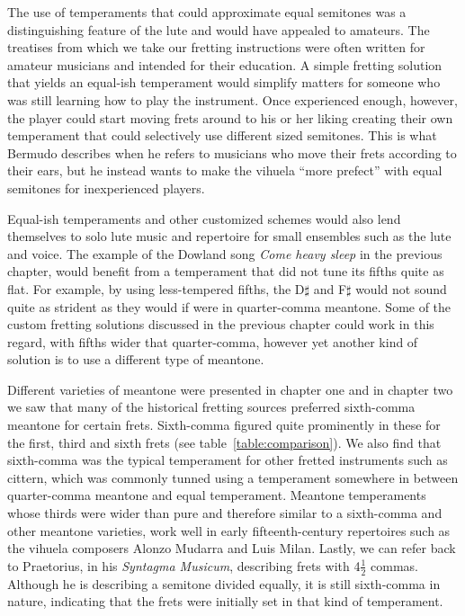 The use of temperaments that could approximate equal semitones was a distinguishing
feature of the lute and would have appealed to amateurs. The treatises from which we
take our fretting instructions were often written for amateur musicians and intended
for their education. A simple fretting solution that yields an equal-ish temperament
would simplify matters for someone who was still learning how to play the instrument.
Once experienced enough, however, the player could start moving frets around to his or
her liking creating their own temperament that could selectively use different sized
semitones. This is what Bermudo describes when he refers to musicians who move their
frets according to their ears, but he instead wants to make the vihuela ``more
prefect'' with equal semitones for inexperienced players.\autocite[78]{DE:1}

Equal-ish temperaments and other customized schemes would also lend themselves to solo
lute music and repertoire for small ensembles such as the lute and voice. The example
of the Dowland song \textit{Come heavy sleep} in the previous chapter, would benefit
from a temperament that did not tune its fifths quite as flat.  For example, by using
less-tempered fifths, the D$\sharp$ and F$\sharp$ would not sound quite as strident as
they would if were in quarter-comma meantone. Some of the custom fretting solutions
discussed in the previous chapter could work in this regard, with fifths wider that
quarter-comma, however yet another kind of solution is to use a different type of
meantone.

Different varieties of meantone were presented in chapter one and in chapter two we saw
that many of the historical fretting sources preferred sixth-comma meantone for certain
frets.   Sixth-comma figured quite prominently in these for the first, third and sixth
frets (see table~\ref{table:comparison}). We also find that sixth-comma was the typical
temperament for other fretted instruments such as cittern, which was commonly tunned
using a temperament somewhere in between quarter-comma meantone and equal temperament.
\autocite[12]{PF:1}  Meantone temperaments whose thirds were wider than pure and
therefore similar to a sixth-comma and other meantone varieties, work well in early
fifteenth-century repertoires such as the vihuela composers Alonzo Mudarra and Luis
Milan.\autocite[56]{WH:1} Lastly, we can refer back to Praetorius, in his
\textit{Syntagma Musicum}, describing frets with 4$ \frac{1}{2} $
commas.\autocite[68]{MP:1} Although he is describing a semitone divided equally, it is
still sixth-comma in nature, indicating that the frets were initially set in that
kind of temperament.


